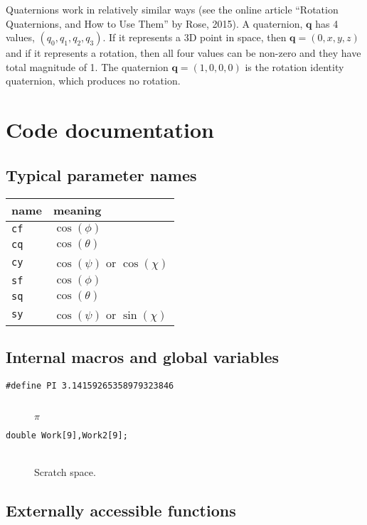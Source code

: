 \documentclass[11pt]{article}
\newcommand {\ttt} {\texttt}
\begin{document}
Quaternions work in relatively similar ways (see the online article ``Rotation Quaternions, and How to Use Them'' by Rose, 2015). A quaternion, $\bm{q}$ has 4 values, $(q_0,q_1,q_2,q_3)$. If it represents a 3D point in space, then $\bm{q}=(0,x,y,z)$ and if it represents a rotation, then all four values can be non-zero and they have total magnitude of 1. The quaternion $\bm{q}=(1,0,0,0)$ is the rotation identity quaternion, which produces no rotation.


\section{Code documentation}

\subsection{Typical parameter names}
\begin{longtable}[c]{ll}
name & meaning \\
\hline
\ttt{cf} & $\cos(\phi)$ \\
\ttt{cq} & $\cos(\theta)$ \\
\ttt{cy} & $\cos(\psi)$ or $\cos(\chi)$ \\
\ttt{sf} & $\cos(\phi)$ \\
\ttt{sq} & $\cos(\theta)$ \\
\ttt{sy} & $\cos(\psi)$ or $\sin(\chi)$
\end{longtable}

\subsection{Internal macros and global variables}

\begin{description}

\item[\ttt{\#define PI 3.14159265358979323846}]
\hfill \\
$\pi$

\item[\ttt{double Work[9],Work2[9];}]
\hfill \\
Scratch space.

\end{description}

\subsection{Externally accessible functions}
\end{document}
